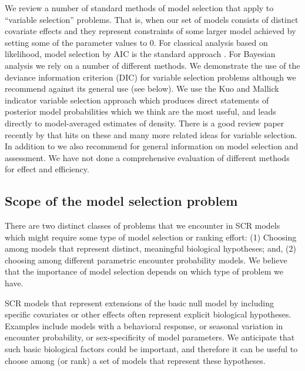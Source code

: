 We review a number of standard methods of model selection that apply
to ``variable selection'' problems. That is, when our set of models
consists of distinct covariate effects and they represent constraints
of some larger model achieved by setting some of the parameter values
to 0.  For classical analysis based on likelihood, model selection by
AIC is the standard approach \citep{burnham_anderson:2002}.  For
Bayesian analysis we rely on a number of different methods.  We
demonstrate the use of the deviance information criterion (DIC)
\citep{spiegelhalter_etal:2002}
 for variable selection problems
although we recommend against its general use (see below).  We use the
Kuo and Mallick indicator variable selection approach
\citep{kuo_mallick:1998} which
produces direct statements
of posterior model probabilities which we think are the most useful,
and leads directly to model-averaged estimates of density.  There is a
good review paper recently by \citet{ohara_sillanpaa:2009} that hits
on these and many more related ideas for variable selection.  
 In addition to \citet{ohara_sillanpaa:2009} we
also recommend \citet[][Chapt. 7]{link_barker:2010} for general
information on model selection and assessment. We have
not done a comprehensive evaluation of different methods for
effect and efficiency. 


\subsection{Scope of the model selection problem}

There are two distinct classes of problems that we encounter in SCR
models which might require some type of model selection or ranking
effort: (1) Choosing among models that represent distinct, meaningful
biological hypotheses; and, (2) choosing among different parametric
encounter probability models. We believe that the importance of model
selection depends on which type of problem we have.

{}
SCR models that represent extensions of the basic null model by
including specific covariates or other effects often represent
explicit biological hypotheses. Examples include models with a
behavioral response, or seasonal variation in encounter probability,
or sex-specificity of model parameters.
We anticipate that such basic biological factors
could be important, and therefore it can be useful to choose among (or
rank) a set of models that represent these hypotheses.

